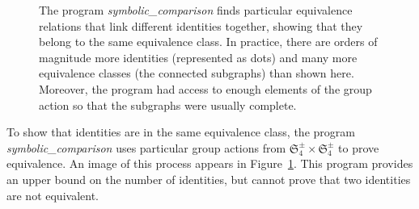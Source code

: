 \documentclass[12pt,table]{article}
\theoremstyle{definition}
\theoremstyle{remark}
\numberwithin{equation}{section}
\begin{document}
\begin{figure}[h]
\begin{center}

\end{center}

\caption{
The program \emph{symbolic\_comparison}
finds particular equivalence relations
that link different identities together,
showing that they belong to the same
equivalence class. In practice,
there are orders of magnitude more
identities (represented as dots) and many more
equivalence classes (the connected subgraphs)
than shown here.
Moreover, the program had access to enough elements
of the group action so that the subgraphs were
usually complete.
}
 
\label{figure_connections}
 
\end{figure}





To show that identities are in the same
equivalence class, the program
\emph{symbolic\_comparison}
uses particular
group actions from 
$ \mathfrak{S}_4^\pm \times \mathfrak{S}_4^\pm $
to prove equivalence.
An image of this process
appears in 
Figure~\ref{figure_connections}.
This program provides an upper
bound on the number of identities,
but cannot prove that two identities
are not equivalent.
\end{document}
